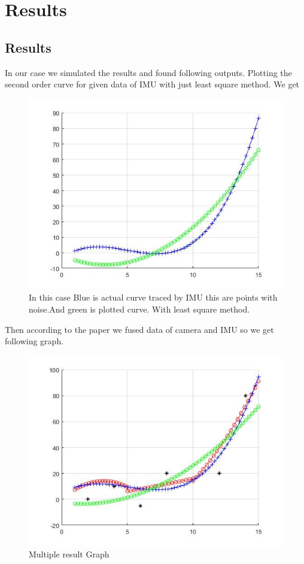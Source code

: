 \section{Results}
\label{Spline_1}

\subsection{Results}
 
 In our case we simulated the results and found following outputs.
Plotting the second order curve for given data of IMU with just least square method. We get

\begin{figure}
\includegraphics[width=\textwidth]{./figures/lsm.jpg}
\caption{In this case Blue is actual curve traced by IMU this are points with noise.And green is plotted curve. With least square method.}
\end{figure}

Then according to the paper we fused data of camera and IMU so we get following graph.

\begin{figure}
\includegraphics[width=\textwidth]{./figures/AllOutput.jpg}
\caption{Multiple result Graph}
\end{figure}

